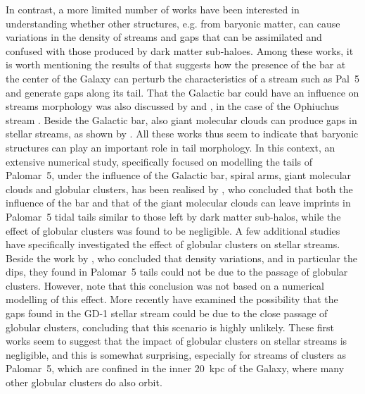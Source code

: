 \documentclass[draft]{aa}
\begin{document}
  In contrast, a more limited number of works have been interested in understanding whether other structures, e.g. from baryonic matter, can cause variations in the density of streams and gaps that can be assimilated and confused with those produced by dark matter sub-haloes.  Among these works, it is worth mentioning the results of \citet{2017NatAs...1..633P} that suggests how the presence of the bar at the center of the Galaxy can perturb the characteristics of a stream such as Pal~5 and generate gaps along its tail. That the Galactic bar could have an influence on streams morphology was also discussed by \citet{2016MNRAS.460..497H} and \citet{2016ApJ...824..104P}, in the case of the Ophiuchus stream \citep{2014MNRAS.443L..84B}. Beside the Galactic bar, also giant molecular clouds can produce gaps in stellar streams, as shown by \citet{2016MNRAS.463L..17A}. All these works thus seem to indicate that baryonic structures can play an important role in tail morphology. In this context,  an extensive numerical study, specifically focused on modelling the tails of Palomar~5, under the influence of the Galactic bar, spiral arms, giant molecular clouds and globular clusters, has been realised by \citet{2019MNRAS.484.2009B}, who concluded that both the influence of the bar and that of the giant molecular clouds can leave imprints in Palomar~5 tidal tails similar to those left by dark matter sub-halos, while the effect of globular clusters was found to be negligible.  A few additional studies have specifically investigated the effect of globular clusters on stellar streams.  Beside the work by \citet{2017MNRAS.470...60E}, who concluded that density variations, and in particular the dips, they found in Palomar~5 tails could not be due to the passage of globular clusters. However, note that this conclusion was not based on a numerical modelling of this effect. More recently \citet{2022ApJ...941..129D} have examined the possibility that the gaps found in the GD-1 stellar stream could be due to the close passage of globular clusters, concluding that this scenario is highly unlikely. These first works seem to suggest that the impact of globular clusters on stellar streams is negligible, and this is somewhat surprising, especially for streams of clusters as Palomar~5, which are confined in the inner 20~kpc of the Galaxy, where many other globular clusters do also orbit. 
  
\end{document}

